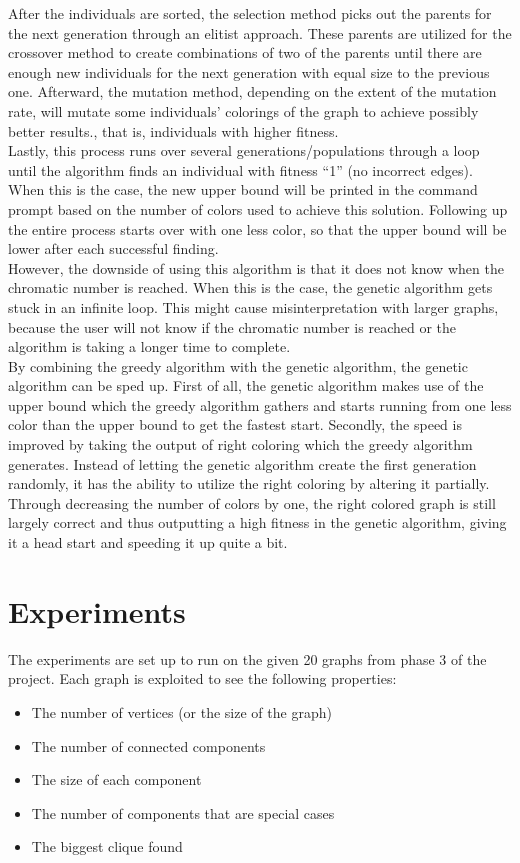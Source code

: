\documentclass[a4paper]{report}
\begin{document}
		After the individuals are sorted, the selection method picks out the parents for the next generation through an elitist approach. These parents are utilized for the crossover method to create combinations of two of the parents until there are enough new individuals for the next generation with equal size to the previous one. Afterward, the mutation method, depending on the extent of the mutation rate, will mutate some individuals’ colorings of the graph to achieve possibly better results., that is, individuals with higher fitness.
\\
		
		Lastly, this process runs over several generations/populations through a loop until the algorithm finds an individual with fitness “1” (no incorrect edges). When this is the case, the new upper bound will be printed in the command prompt based on the number of colors used to achieve this solution. Following up the entire process starts over with one less color, so that the upper bound will be lower after each successful finding.\\
		
		However, the downside of using this algorithm is that it does not know when the chromatic number is reached. When this is the case, the genetic algorithm gets stuck in an infinite loop. This might cause misinterpretation with larger graphs, because the user will not know if the chromatic number is reached or the algorithm is taking a longer time to complete.
\\
		
		By combining the greedy algorithm with the genetic algorithm, the genetic algorithm can be sped up. First of all, the genetic algorithm makes use of the upper bound which the greedy algorithm gathers and starts running from one less color than the upper bound to get the fastest start. Secondly, the speed is improved by taking the output of right coloring which the greedy algorithm generates. Instead of letting the genetic algorithm create the first generation randomly, it has the ability to utilize the right coloring by altering it partially. Through decreasing the number of colors by one, the right colored graph is still largely correct and thus outputting a high fitness in the genetic algorithm, giving it a head start and speeding it up quite a bit.
		
		
		
	\chapter{Experiments}
	The experiments are set up to run on the given 20 graphs from phase 3 of the project. Each graph is exploited to see the following properties:
	\begin{itemize}
		\item The number of vertices (or the size of the graph)
		\item The number of connected components
		\item The size of each component
		\item The number of components that are special cases
		\item The biggest clique found
	\end{itemize}
\end{document}

